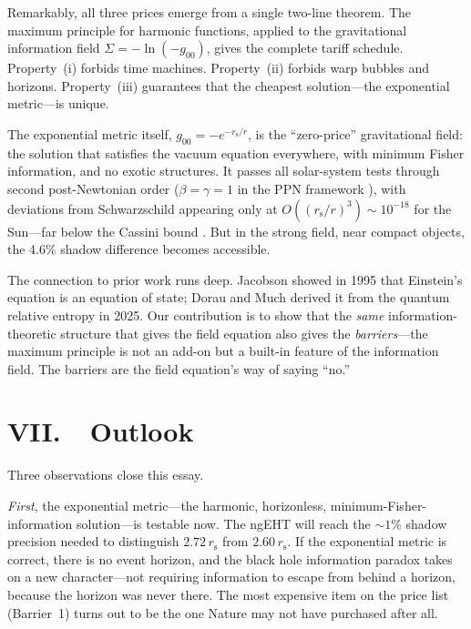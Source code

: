 \documentclass[12pt]{article}
\newcommand{\rs}{r_{\mathrm{s}}}
\begin{document}
Remarkably, all three prices emerge from a single two-line theorem.
The maximum principle for harmonic functions, applied to the
gravitational information field $\Sigma = -\ln(-g_{00})$, gives the
complete tariff schedule. Property~(i) forbids time machines.
Property~(ii) forbids warp bubbles and horizons. Property~(iii)
guarantees that the cheapest solution---the exponential
metric---is unique.

The exponential metric itself, $g_{00} = -e^{-\rs/r}$, is the
``zero-price'' gravitational field: the solution that satisfies the
vacuum equation everywhere, with minimum Fisher information, and no
exotic structures. It passes all solar-system tests through second
post-Newtonian order ($\beta = \gamma = 1$ in the PPN framework
\cite{Will2014}), with deviations from Schwarzschild appearing only
at $O((\rs/r)^3) \sim 10^{-18}$ for the Sun---far below the Cassini
bound \cite{Bertotti2003}. But in the strong field, near compact
objects, the 4.6\% shadow difference becomes accessible.

The connection to prior work runs deep. Jacobson \cite{Jacobson1995}
showed in 1995 that Einstein's equation is an equation of state;
Dorau and Much \cite{DorauMuch2025} derived it from the quantum
relative entropy in 2025. Our contribution is to show that the
\emph{same} information-theoretic structure that gives the field
equation also gives the \emph{barriers}---the maximum principle is
not an add-on but a built-in feature of the information field.
The barriers are the field equation's way of saying ``no.''


\section*{VII.\ \ Outlook}

Three observations close this essay.

\emph{First}, the exponential metric---the harmonic, horizonless,
minimum-Fisher-information solution---is testable now. The ngEHT will
reach the ${\sim}1\%$ shadow precision needed to distinguish
$2.72\,\rs$ from $2.60\,\rs$. If the exponential metric is correct,
there is no event horizon, and the black hole information paradox
takes on a new character---not requiring information to escape from
behind a horizon, because the horizon was never there. The most expensive item on the
price list (Barrier~1) turns out to be the one Nature may not have
purchased after all.
\end{document}
